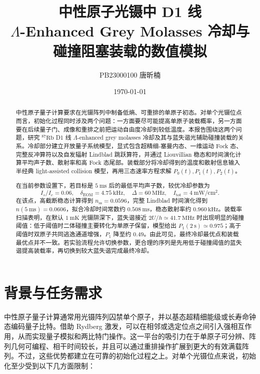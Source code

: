 \documentclass[UTF8,a4paper,12pt]{ctexart}
\title{\bfseries 中性原子光镊中 \Rb{} D1 线\\
$\Lambda$-Enhanced Grey Molasses 冷却与碰撞阻塞装载的数值模拟}
\author{PB23000100 唐昕楠}
\date{\today}
\newcommand{\Rb}{\ensuremath{^{87}\mathrm{Rb}}}
\begin{document}
\maketitle

\begin{abstract}
中性原子量子计算要求在光镊阵列中制备低熵、可重排的单原子初态。对单个光镊位点而言，初始化过程同时涉及两个问题：一方面要尽可能提高单原子装载概率，另一方面要在后续量子门、成像和重排之前把运动自由度冷却到较低温度。本报告围绕这两个问题，研究 \Rb{} D1 线 $\Lambda$-enhanced grey molasses 冷却及其与蓝失谐光辅助碰撞装载的关系。冷却部分建立开放量子系统模型，显式包含超精细-塞曼内态、一维运动 Fock 态、完整反冲算符以及自发辐射 Lindblad 跳跃算符，并通过 Liouvillian 稳态和时间演化计算平均声子数、散射率和高 Fock 态尾部。装载部分将冷却得到的温度和散射信息输入半经典 light-assisted collision 模型，再用三态速率方程求解 $P_0(t),P_1(t),P_2(t)$。

在当前参数设置下，若目标是 $5~\mathrm{ms}$ 后的最低平均声子数，较优冷却参数为
\[
I_s/I_c=0.06,\quad
\delta_{\mathrm{EOM}}=4.75~\mathrm{kHz},\quad
\Delta=60~\mathrm{MHz},\quad
I_{\mathrm{tot}}=4~\mathrm{mW/cm^2}.
\]
在该点，高截断稳态计算得到 $n_{\mathrm{ss}}=0.0596$，完整 Lindblad 时间演化得到 $n(5~\mathrm{ms})=0.0606$，拟合冷却时间常数约 $0.508~\mathrm{ms}$，稳态散射率约 $0.960~\mathrm{kHz}$。装载率扫描表明，在默认 $1~\mathrm{mK}$ 光镊阱深下，蓝失谐接近 $2U/h\simeq41.7~\mathrm{MHz}$ 时出现明显的碰撞阈值：低于阈值时二体碰撞主要转化为单原子保留，模型给出 $P_1(2~\mathrm{s})\simeq0.975$；高于阈值时双原子共同逃逸通道增强，$P_1$ 降至约 $0.49$。由此可见，最终冷却最优点和装载最优点并不一致。若实验流程允许切换参数，更合理的序列是先用低于碰撞阈值的蓝失谐提高装载率，再切换到较大蓝失谐完成最终冷却。
\end{abstract}

\section{背景与任务需求}

中性原子量子计算通常用光镊阵列囚禁单个原子，并以基态超精细能级或长寿命钟态编码量子比特。借助 Rydberg 激发，可以在相邻或选定位点之间引入强相互作用，从而实现量子模拟和两比特门操作\cite{saffman2016,browaeys2020}。这一平台的吸引力在于单原子可分辨、阵列几何可编程、相干时间较长，并且可以通过重排操作扩展到更大的有效满载阵列。不过，这些优势都建立在可靠的初始化过程之上。对单个光镊位点来说，初始化至少受到以下几方面限制：
\end{document}

